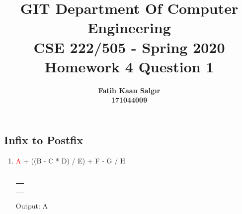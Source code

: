 \documentclass[a4paper]{article}
\title{\textbf{GIT Department Of Computer Engineering\\ 
CSE 222/505 - Spring 2020\\
Homework 4 Question 1 \vspace{1in}}}
\author{\textbf{Fatih Kaan Salgır} \\ 
\textbf{171044009}}
\date{}
\begin{document}
\begin{large}

  \maketitle

  \newpage



  \section{}

  \subsection{Infix to Postfix}

  \begin{enumerate}
    \renewcommand{\arraystretch}{1.3}
    \item
          \textcolor{red}{A} + ((B - C * D) / E) + F - G / H\\
          \\
          \begin{tabular}[t]{ | p{1em} | } \\ \hline
            \\ \hline \\ \hline \\ \hline \\ \hline
          \end{tabular}
          \hspace{2em}
          Output: A



\end{enumerate}
\end{large}
\end{document}
